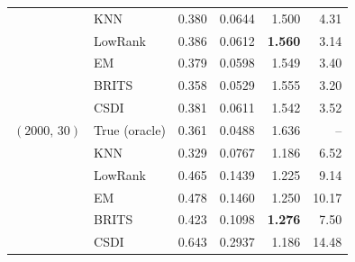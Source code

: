 \begin{table}[htbp]
\begin{tabular}{llrrrr}
     & KNN & 0.380 & 0.0644 & 1.500 & 4.31 \\
     & LowRank & 0.386 & 0.0612 & \textbf{1.560} & 3.14 \\
     & EM & 0.379 & 0.0598 & 1.549 & 3.40 \\
     & BRITS & 0.358 & 0.0529 & 1.555 & 3.20 \\
     & CSDI & 0.381 & 0.0611 & 1.542 & 3.52 \\
    \midrule
    $(2000,\, 30)$ & True (oracle) & 0.361 & 0.0488 & 1.636 & -- \\
     & KNN & 0.329 & 0.0767 & 1.186 & 6.52 \\
     & LowRank & 0.465 & 0.1439 & 1.225 & 9.14 \\
     & EM & 0.478 & 0.1460 & 1.250 & 10.17 \\
     & BRITS & 0.423 & 0.1098 & \textbf{1.276} & 7.50 \\
     & CSDI & 0.643 & 0.2937 & 1.186 & 14.48 \\
    \bottomrule
  \end{tabular}
\end{table}

